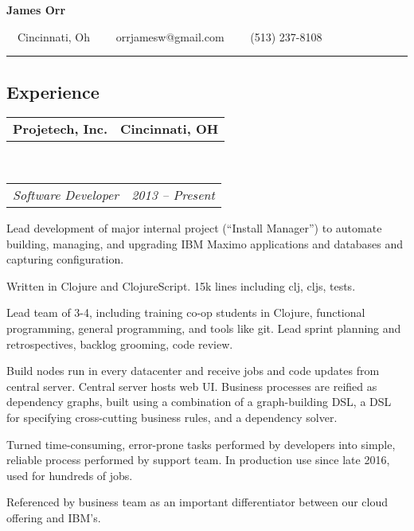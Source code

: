 \documentclass[10pt,letterpaper]{article}
\makeatletter
\newcommand{\headerrow}[2]
{\begin{tabular*}{\linewidth}{l@{\extracolsep{\fill}}r}
	#1 &
	#2 \\
\end{tabular*}}
\makeatother
\begin{document}
\begin{center}
{\LARGE \textbf{James Orr}}

\ \ Cincinnati, Oh\ \ \textbullet
\ \ orrjamesw@gmail.com\ \ \textbullet
\ \ (513) 237-8108
\end{center}

\hrule
\vspace{-0.4em}
\subsection*{Experience}

\headerrow
    {\textbf{Projetech, Inc.}}
    {\textbf{Cincinnati, OH}}
    \\
    \headerrow
	{\emph{Software Developer}}
	{\emph{2013 -- Present}}
	\begin{itemize*}
	\item Lead development of major internal project (``Install Manager'') to automate building, managing, and upgrading IBM Maximo applications and databases and capturing configuration.
          \begin{itemize*}
          \item Written in Clojure and ClojureScript.  15k lines including clj, cljs, tests.
          \item Lead team of 3-4, including training co-op students in Clojure, functional programming, general programming, and tools like git.  Lead sprint planning and retrospectives, backlog grooming, code review.
          \item Build nodes run in every datacenter and receive jobs and code updates from central server.  Central server hosts web UI.  Business processes are reified as dependency graphs, built using a combination of a graph-building DSL, a DSL for specifying cross-cutting business rules, and a dependency solver.
          \item Turned time-consuming, error-prone tasks performed by developers into simple, reliable process performed by support team.  In production use since late 2016, used for hundreds of jobs.
          \item Referenced by business team as an important differentiator between our cloud offering and IBM's.
          \end{itemize*}


\end{itemize*}
\end{document}
